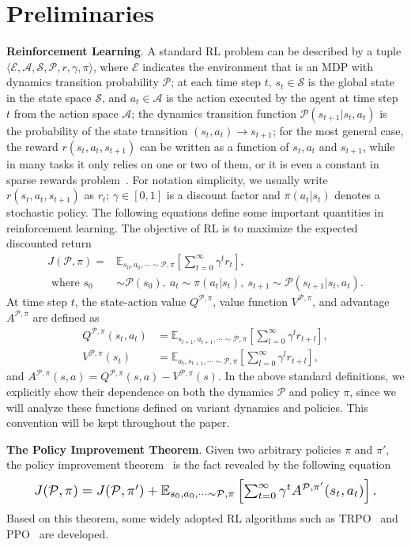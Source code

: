\documentclass[letterpaper]{article} %
\def\E{{\mathbb{E}}}
\def\P{{\mathcal{P}}}
\def\A{{\mathcal{A}}}
\def\S{{\mathcal{S}}}
\begin{document}
\section{Preliminaries}
\textbf{Reinforcement Learning}.
A standard RL problem can be described by a tuple $\langle \mathcal{E}, \A, \S, \P, r, \gamma, \pi \rangle$, where $\mathcal{E}$ indicates the environment that is an MDP with dynamics transition probability $\P$; at each time step $t$, $s_t\in\S$ is the global state in the state space $\S$, and $a_t\in\A$ is the action executed by the agent at time step $t$ from the action space $\A$; the dynamics transition function $\P(s_{t+1}|s_t,a_t)$ is the probability of the state transition $(s_t,a_t)\xrightarrow{}s_{t+1}$; for the most general case, the reward $r(s_t,a_t,s_{t+1})$ can be written as a function of $s_t,a_t$ and $s_{t+1}$, while in many tasks it only relies on one or two of them, or it is even a constant in sparse rewards problem~\citep{xu2023efficient}. For notation simplicity, we usually write $r(s_t,a_t,s_{t+1})$ as $r_t$; $\gamma\in[0,1]$ is a discount factor and $\pi(a_t|s_t)$ denotes a stochastic policy. The following equations define some important quantities in reinforcement learning. 
The objective of RL is to maximize the expected discounted return
\begin{align}
J(\P,\pi)= & \mathbb{E}_{s_0,a_0,\cdots\sim\P,\pi}
\left[ \sum_{t=0}^{\infty}\gamma^t r_t \right], \\
\text{ where } s_0&\sim\P(s_0),\ 
a_t\sim\pi(a_t|s_t),\ s_{t+1}\sim\P(s_{t+1}|s_t,a_t). \nonumber
\end{align}
At time step $t$, the state-action value $Q^{\P,\pi}$, value function $V^{\P,\pi}$, and advantage $A^{\P,\pi}$ are defined as
\begin{align}
Q^{\P,\pi}(s_t,a_t)&=\E_{s_{t+1},a_{t+1},\cdots\sim\P,\pi}
\left[
\sum_{l=0}^{\infty}\gamma^l r_{t+l}
\right], \\
V^{\P,\pi}(s_t)&=\E_{a_{t},s_{t+1},\cdots\sim\P,\pi}
\left[
\sum_{l=0}^{\infty}\gamma^l r_{t+l}
\right],
\end{align}
and $A^{\P,\pi}(s,a)=Q^{\P,\pi}(s,a)-V^{\P,\pi}(s)$. 
In the above standard definitions, we explicitly show their dependence on both the dynamics $\P$ and policy $\pi$, since we will analyze these functions defined on variant dynamics and policies. This convention will be kept throughout the paper.

\textbf{The Policy Improvement Theorem}.
Given two arbitrary policies $\pi$ and $\pi'$, the policy improvement theorem~\citep{kakade2002,schulman2015trust} is the fact revealed by the following equation
\begin{equation}
\resizebox{.9\hsize}{!}{$
J(\P,\pi)=J(\P,\pi')+\E_{s_0,a_0,\cdots\sim\P,\pi}
\left[
\sum_{t=0}^\infty\gamma^t A^{\P,\pi'}(s_t,a_t)
\right].
$}
\label{eq:pit}
\end{equation}
Based on this theorem, some widely adopted RL algorithms such as TRPO~\citep{schulman2015trust} and PPO~\citep{schulman2017proximal} are developed. 
\end{document}
